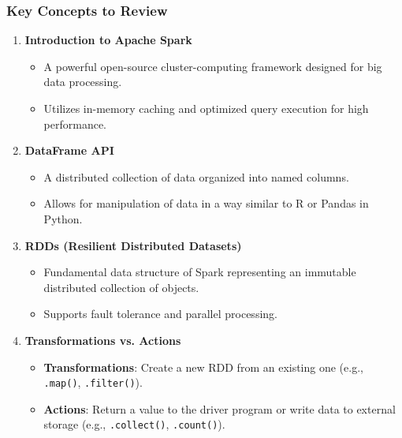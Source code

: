 \documentclass[aspectratio=169]{beamer}
\begin{document}
\begin{frame}[fragile]
  \frametitle{Key Concepts to Review}
  \begin{enumerate}
    \item \textbf{Introduction to Apache Spark}
      \begin{itemize}
        \item A powerful open-source cluster-computing framework designed for big data processing.
        \item Utilizes in-memory caching and optimized query execution for high performance.
      \end{itemize}
    \item \textbf{DataFrame API}
      \begin{itemize}
        \item A distributed collection of data organized into named columns.
        \item Allows for manipulation of data in a way similar to R or Pandas in Python.
      \end{itemize}
    \item \textbf{RDDs (Resilient Distributed Datasets)}
      \begin{itemize}
        \item Fundamental data structure of Spark representing an immutable distributed collection of objects.
        \item Supports fault tolerance and parallel processing.
      \end{itemize}
    \item \textbf{Transformations vs. Actions}
      \begin{itemize}
        \item \textbf{Transformations}: Create a new RDD from an existing one (e.g., \texttt{.map()}, \texttt{.filter()}).
        \item \textbf{Actions}: Return a value to the driver program or write data to external storage (e.g., \texttt{.collect()}, \texttt{.count()}).
      \end{itemize}
  \end{enumerate}
\end{frame}
\end{document}
